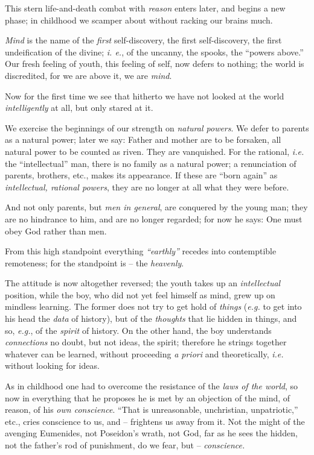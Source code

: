 \documentclass[12pt,a4paper]{book}
\begin{document}
This stern life-and-death combat with \textit{reason} enters later, and begins 
a new phase; in childhood we scamper about without racking our brains much.

\textit{Mind} is the name of the \textit{first} self-discovery, the first 
self-discovery, the first undeification of the divine; \textit{i. e.}, of the 
uncanny, the spooks, the ``powers above.'' Our fresh feeling of youth, this 
feeling of self, now defers to nothing; the world is discredited, for we are 
above it, we are \textit{mind}.

Now for the first time we see that hitherto we have not looked at the world 
\textit{intelligently} at all, but only stared at it.

We exercise the beginnings of our strength on \textit{natural powers}. We 
defer to parents as a natural power; later we say: Father and mother are to be 
forsaken, all natural power to be counted as riven. They are vanquished. For 
the rational, \textit{i.e.} the ``intellectual'' man, there is no family as 
a natural power; a renunciation of parents, brothers, etc., makes its 
appearance. If these are ``born again'' as \textit{intellectual, rational 
powers}, they are no longer at all what they were before.

And not only parents, but \textit{men in general}, are conquered by the young 
man; they are no hindrance to him, and are no longer regarded; for now he 
says: One must obey God rather than men.

From this high standpoint everything \textit{``earthly''} recedes into 
contemptible remoteness; for the standpoint is -- the \textit{heavenly}.

The attitude is now altogether reversed; the youth takes up an 
\textit{intellectual} position, while the boy, who did not yet feel himself as 
mind, grew up on mindless learning. The former does not try to get hold of 
\textit{things} (\textit{e.g.} to get into his head the \textit{data} of 
history), but of the \textit{thoughts} that lie hidden in things, and so, 
\textit{e.g.}, of the \textit{spirit} of history. On the other hand, the boy 
understands \textit{connections} no doubt, but not ideas, the spirit; 
therefore he strings together whatever can be learned, without proceeding 
\textit{a priori} and theoretically, \textit{i.e.} without looking for ideas.

As in childhood one had to overcome the resistance of the \textit{laws of the 
world}, so now in everything that he proposes he is met by an objection of the 
mind, of reason, of his \textit{own conscience}. ``That is unreasonable, 
unchristian, unpatriotic,'' etc., cries conscience to us, and -- frightens us 
away from it. Not the might of the avenging Eumenides, not Poseidon's wrath, 
not God, far as he sees the hidden, not the father's rod of punishment, do we 
fear, but -- \textit{conscience.}
\end{document}
